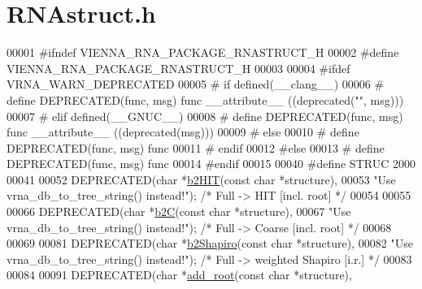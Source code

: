 \hypertarget{RNAstruct_8h_source}{}\section{R\+N\+Astruct.\+h}
\label{RNAstruct_8h_source}

\begin{DoxyCode}
00001 \textcolor{preprocessor}{#ifndef VIENNA\_RNA\_PACKAGE\_RNASTRUCT\_H}
00002 \textcolor{preprocessor}{#define VIENNA\_RNA\_PACKAGE\_RNASTRUCT\_H}
00003 
00004 \textcolor{preprocessor}{#ifdef VRNA\_WARN\_DEPRECATED}
00005 \textcolor{preprocessor}{# if defined(\_\_clang\_\_)}
00006 \textcolor{preprocessor}{#  define DEPRECATED(func, msg) func \_\_attribute\_\_ ((deprecated("", msg)))}
00007 \textcolor{preprocessor}{# elif defined(\_\_GNUC\_\_)}
00008 \textcolor{preprocessor}{#  define DEPRECATED(func, msg) func \_\_attribute\_\_ ((deprecated(msg)))}
00009 \textcolor{preprocessor}{# else}
00010 \textcolor{preprocessor}{#  define DEPRECATED(func, msg) func}
00011 \textcolor{preprocessor}{# endif}
00012 \textcolor{preprocessor}{#else}
00013 \textcolor{preprocessor}{# define DEPRECATED(func, msg) func}
00014 \textcolor{preprocessor}{#endif}
00015 
00040 \textcolor{preprocessor}{#define STRUC     2000}
00041 
00052 DEPRECATED(\textcolor{keywordtype}{char} *\hyperlink{group__struct__utils__deprecated_ga07b7e90e712559a1992fba3ac6d21bbd}{b2HIT}(\textcolor{keyword}{const} \textcolor{keywordtype}{char} *structure),
00053            \textcolor{stringliteral}{"Use vrna\_db\_to\_tree\_string() instead!"});             \textcolor{comment}{/* Full   -> HIT    [incl. root] */}
00054 
00055 
00066 DEPRECATED(\textcolor{keywordtype}{char} *\hyperlink{group__struct__utils__deprecated_ga9c80d92391f2833549a8b6dac92233f0}{b2C}(\textcolor{keyword}{const} \textcolor{keywordtype}{char} *structure),
00067            \textcolor{stringliteral}{"Use vrna\_db\_to\_tree\_string() instead!"});               \textcolor{comment}{/* Full   -> Coarse [incl. root] */}
00068 
00069 
00081 DEPRECATED(\textcolor{keywordtype}{char} *\hyperlink{group__struct__utils__deprecated_ga5cd2feb367feeacad0c03cb7ddba5f10}{b2Shapiro}(\textcolor{keyword}{const} \textcolor{keywordtype}{char} *structure),
00082            \textcolor{stringliteral}{"Use vrna\_db\_to\_tree\_string() instead!"});         \textcolor{comment}{/* Full -> weighted Shapiro [i.r.] */}
00083 
00084 
00091 DEPRECATED(\textcolor{keywordtype}{char} *\hyperlink{group__struct__utils__deprecated_ga880d33066dd95441e5fbb73c57ed1c3e}{add\_root}(\textcolor{keyword}{const} \textcolor{keywordtype}{char} *structure),

\end{DoxyCode}
